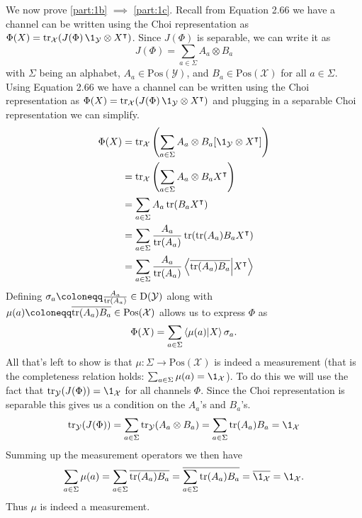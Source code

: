 \documentclass[boxes,pages,color=SeaGreen]{homework}
\newcommand{\X}{\mathcal{X}}
\newcommand{\Y}{\mathcal{Y}}
\newcommand{\Pos}{\mathrm{Pos}}
\newcommand{\Density}{\mathrm{D}}
\begin{document}
\begin{solution}
  We now prove \ref{part:1b} $\implies$ \ref{part:1c}.
  Recall from Equation 2.66 we have a channel can be written using the Choi representation as $\Phi(X) = \tr_\X(J(\Phi)\,\1_\Y\otimes X^\intercal)$.
  Since $J(\Phi)$ is separable, we can write it as
  \begin{equation*}
    J(\Phi) = \sum_{a\in\Sigma}A_a\otimes B_a
  \end{equation*}
  with $\Sigma$ being an alphabet, $A_a\in\Pos(\Y)$, and $B_a\in\Pos(\X)$ for all $a\in\Sigma$.
  Using Equation 2.66 we have a channel can be written using the Choi representation as $\Phi(X) = \tr_\X(J(\Phi)\,\1_\Y\otimes X^\intercal)$ and plugging in a separable Choi representation we can simplify.
  \begin{align*}
    \Phi(X) & = \tr_\X\qty(\sum_{a\in\Sigma}A_a\otimes B_a [\1_\Y\otimes X^\intercal])        \\
            & = \tr_\X\qty(\sum_{a\in\Sigma}A_a \otimes B_a X^\intercal)                      \\
            & = \sum_{a\in\Sigma}A_a\tr(B_a X^\intercal)                                      \\
            & = \sum_{a\in\Sigma}\frac{A_a}{\tr(A_a)}\tr(\tr(A_a)B_a X^\intercal)             \\
            & = \sum_{a\in\Sigma}\frac{A_a}{\tr(A_a)}\ip{\overline{\tr(A_a)B_a}}{X^\intercal}
  \end{align*}
  Defining $\sigma_a \defeq \frac{A_a}{\tr(A_a)}\in\Density(\Y)$ along with $\mu(a) \defeq \overline{\tr(A_a)B_a} \in \Pos(\X)$ allows us to express $\Phi$ as
  \begin{equation*}
    \Phi(X) = \sum_{a\in\Sigma}\ip{\mu(a)}{X}\sigma_a.
  \end{equation*}
  All that's left to show is that $\mu:\Sigma\to\Pos(\X)$ is indeed a measurement (that is the completeness relation holds: $\sum_{a\in\Sigma}\mu(a) = \1_\X$).
  To do this we will use the fact that $\tr_\Y(J(\Phi)) = \1_\X$ for all channels $\Phi$.
  Since the Choi representation is separable this gives us a condition on the $A_a$'s and $B_a$'s.
  \begin{equation*}
    \tr_\Y(J(\Phi)) = \sum_{a\in\Sigma}\tr_\Y(A_a\otimes B_a) = \sum_{a\in\Sigma}\tr(A_a)B_a = \1_\X
  \end{equation*}
  Summing up the measurement operators we then have
  \begin{align*}
    \sum_{a\in\Sigma}\mu(a) = \sum_{a\in\Sigma}\overline{\tr(A_a)B_a} = \overline{\sum_{a\in\Sigma}\tr(A_a)B_a} = \overline{\1_\X} = \1_\X.
  \end{align*}
  Thus $\mu$ is indeed a measurement.



\end{solution}
\end{document}
